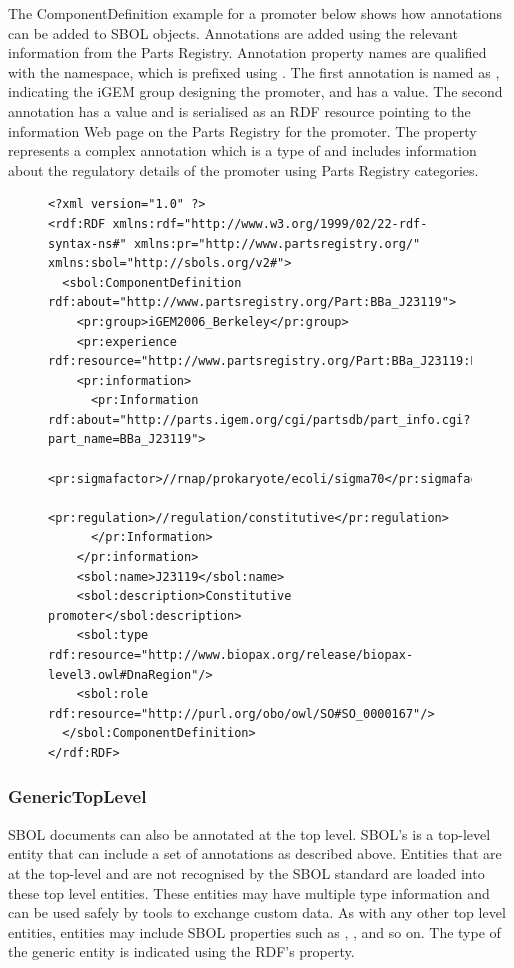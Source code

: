 The ComponentDefinition example for a promoter below shows how annotations can be added to SBOL objects. Annotations are added using the relevant information from the Parts Registry. Annotation property names are qualified with the  namespace, which is prefixed using . The first annotation is named as , indicating the iGEM group designing the promoter, and has a  value. The second  annotation has a  value and is serialised as an RDF resource pointing to the information Web page on the Parts Registry for the promoter. The   property represents a complex annotation which is a type of  and includes information about the regulatory details of the promoter using Parts Registry categories.   

\begin{figure} [ht]
\begin{lstlisting}
<?xml version="1.0" ?>
<rdf:RDF xmlns:rdf="http://www.w3.org/1999/02/22-rdf-syntax-ns#" xmlns:pr="http://www.partsregistry.org/" xmlns:sbol="http://sbols.org/v2#">
  <sbol:ComponentDefinition rdf:about="http://www.partsregistry.org/Part:BBa_J23119">
    <pr:group>iGEM2006_Berkeley</pr:group>
    <pr:experience rdf:resource="http://www.partsregistry.org/Part:BBa_J23119:Experience"/>
    <pr:information>
      <pr:Information rdf:about="http://parts.igem.org/cgi/partsdb/part_info.cgi?part_name=BBa_J23119">
        <pr:sigmafactor>//rnap/prokaryote/ecoli/sigma70</pr:sigmafactor>
        <pr:regulation>//regulation/constitutive</pr:regulation>
      </pr:Information>
    </pr:information>
    <sbol:name>J23119</sbol:name>
    <sbol:description>Constitutive promoter</sbol:description>
    <sbol:type rdf:resource="http://www.biopax.org/release/biopax-level3.owl#DnaRegion"/>
    <sbol:role rdf:resource="http://purl.org/obo/owl/SO#SO_0000167"/>
  </sbol:ComponentDefinition>
</rdf:RDF>
\end{lstlisting}
\label{ser:Annotation}
\end{figure}




\subsubsection{GenericTopLevel}  
\label{sec:GenericTopLevel}
SBOL documents can also be annotated at the top level. SBOL's  is a top-level entity that can include a set of annotations as described above. Entities that are at the top-level and are not recognised by the SBOL standard are loaded into these top level entities. These  entities may have multiple type information and can be used safely by tools to exchange custom data. As with any other top level entities,  entities may include SBOL properties such as , ,  and so on. The type of the generic entity is indicated using the RDF's  property.

